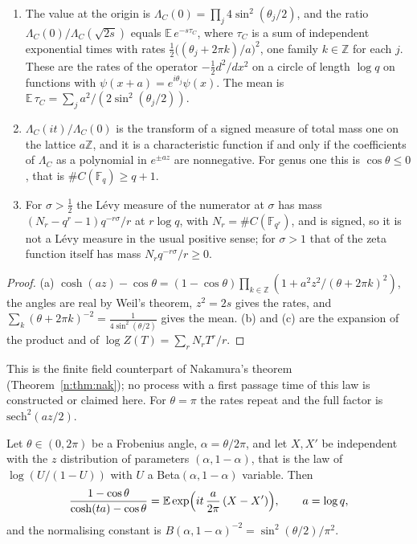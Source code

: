 \begin{proposition}\label{mql:prop:nakamura}
\begin{enumerate}
\item The value at the origin is $\Lambda_C(0)=\prod_j4\sin^2(\theta_j/2)$, and the ratio $\Lambda_C(0)/\Lambda_C(\sqrt{2s})$ equals $\mathbb E\,e^{-s\tau_C}$, where $\tau_C$ is a sum of independent exponential times with rates $\frac12\big((\theta_j+2\pi k)/a\big)^2$, one family $k\in\mathbb Z$ for each $j$. These are the rates of the operator $-\frac12d^2/dx^2$ on a circle of length $\log q$ on functions with $\psi(x+a)=e^{i\theta_j}\psi(x)$. The mean is $\mathbb E\,\tau_C=\sum_ja^2/(2\sin^2(\theta_j/2))$.
\item $\Lambda_C(it)/\Lambda_C(0)$ is the transform of a signed measure of total mass one on the lattice $a\mathbb Z$, and it is a characteristic function if and only if the coefficients of $\Lambda_C$ as a polynomial in $e^{\pm az}$ are nonnegative. For genus one this is $\cos\theta\le0$, that is $\#C(\mathbb F_q)\ge q+1$.
\item For $\sigma>\frac12$ the L\'evy measure of the numerator at $\sigma$ has mass $(N_r-q^r-1)q^{-r\sigma}/r$ at $r\log q$, with $N_r=\#C(\mathbb F_{q^r})$, and is signed, so it is not a L\'evy measure in the usual positive sense; for $\sigma>1$ that of the zeta function itself has mass $N_rq^{-r\sigma}/r\ge0$.
\end{enumerate}
\end{proposition}

\begin{proof}
(a) $\cosh(az)-\cos\theta=(1-\cos\theta)\prod_{k\in\mathbb Z}(1+a^2z^2/(\theta+2\pi k)^2)$, the angles are real by Weil's theorem, $z^2=2s$ gives the rates, and $\sum_k(\theta+2\pi k)^{-2}=\frac1{4\sin^2(\theta/2)}$ gives the mean. (b) and (c) are the expansion of the product and of $\log Z(T)=\sum_rN_rT^r/r$.
\end{proof}

This is the finite field counterpart of Nakamura's theorem \cite{Nakamura15} (Theorem~\ref{n:thm:nak}); no process with a first passage time of this law is constructed or claimed here. For $\theta=\pi$ the rates repeat and the full factor is $\mathrm{sech}^2(az/2)$.

\begin{proposition}\label{mql:prop:zdist}
Let $\theta\in(0,2\pi)$ be a Frobenius angle, $\alpha=\theta/2\pi$, and let $X,X'$ be independent with the $z$ distribution \cite{BNKS82} of parameters $(\alpha,1-\alpha)$, that is the law of $\log(U/(1-U))$ with $U$ a Beta$(\alpha,1-\alpha)$ variable. Then
\[
\frac{1-\cos\theta}{\cosh(ta)-\cos\theta}=\mathbb E\exp\Bigl(it\,\frac{a}{2\pi}\,(X-X')\Bigr),\qquad a=\log q,
\]
and the normalising constant is $B(\alpha,1-\alpha)^{-2}=\sin^2(\theta/2)/\pi^2$.
\end{proposition}

